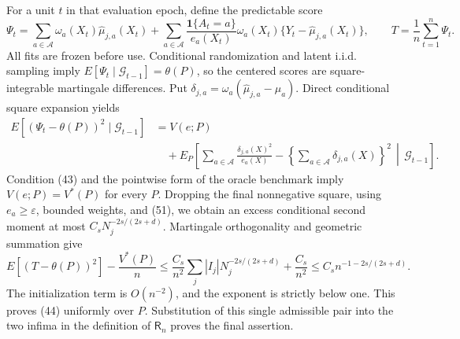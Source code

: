 For a unit \(t\) in that evaluation epoch, define the predictable score
\[
\Psi_t=
\sum_{a\in\mathcal A}\omega_a(X_t)\widehat\mu_{j,a}(X_t)
+\sum_{a\in\mathcal A}
\frac{\mathbf1\{A_t=a\}}{e_a(X_t)}
\omega_a(X_t)\{Y_t-\widehat\mu_{j,a}(X_t)\},
\qquad
T=\frac1n\sum_{t=1}^n\Psi_t.
\tag{52}
\]
All fits are frozen before use. Conditional randomization and latent i.i.d. sampling imply \(E[\Psi_t\mid\mathcal G_{t-1}]=\theta(P)\), so the centered scores are square-integrable martingale differences. Put \(\delta_{j,a}=\omega_a(\widehat\mu_{j,a}-\mu_a)\). Direct conditional square expansion yields
\[
\begin{aligned}
E[(\Psi_t-\theta(P))^2\mid\mathcal G_{t-1}]
&=V(e;P)\\
&\quad+E_P\!\left[
\sum_{a\in\mathcal A}\frac{\delta_{j,a}(X)^2}{e_a(X)}
-\left\{\sum_{a\in\mathcal A}\delta_{j,a}(X)\right\}^2
\,\middle|\,\mathcal G_{t-1}\right].
\end{aligned}
\tag{53}
\]
Condition (43) and the pointwise form of the oracle benchmark imply \(V(e;P)=V^*(P)\) for every \(P\). Dropping the final nonnegative square, using \(e_a\geq\varepsilon\), bounded weights, and (51), we obtain an excess conditional second moment at most \(C_sN_j^{-2s/(2s+d)}\). Martingale orthogonality and geometric summation give
\[
E[(T-\theta(P))^2]-\frac{V^*(P)}n
\leq\frac{C_s}{n^2}\sum_j |I_j|N_j^{-2s/(2s+d)}+\frac{C_s}{n^2}
\leq C_s n^{-1-2s/(2s+d)}.
\tag{54}
\]
The initialization term is \(O(n^{-2})\), and the exponent is strictly below one. This proves (44) uniformly over \(P\). Substitution of this single admissible pair into the two infima in the definition of \(\mathsf R_n\) proves the final assertion.